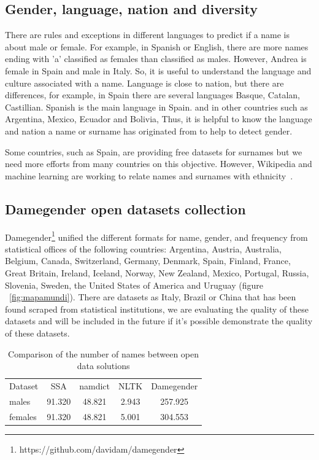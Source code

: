 \documentclass[a4paper]{article}
\begin{document}
\subsection{Gender, language, nation and diversity}
\label{sec:diversity}

There are rules and exceptions in different languages to predict if
a name is about male or female. For example, in Spanish or English,
there are more names ending with 'a' classified as females than
classified as males. However, Andrea is female in Spain and
male in Italy. So, it is useful to understand the language and culture
associated with a name. Language is close to nation, but there are
differences, for example, in Spain there are several languages Basque,
Catalan, Castillian. Spanish is the main language in Spain.
and in other countries such as Argentina, Mexico, Ecuador and Bolivia,
Thus, it is helpful to know the language and nation a name or surname
has originated from to help to detect gender.

Some countries, such as Spain, are providing free datasets for
surnames but we need more efforts from many countries on this
objective. However, Wikipedia and machine learning are working
to relate names and surnames with ethnicity~\cite{ambekar2009name}.

\subsection{Damegender open datasets collection}
\label{sec:damegender}

Damegender\footnote{https://github.com/davidam/damegender}
unified the different formats for name, gender,
and frequency from statistical offices of the following countries:
Argentina, Austria, Australia, Belgium, Canada, Switzerland, Germany,
Denmark, Spain, Finland, France, Great Britain, Ireland, Iceland,
Norway, New Zealand, Mexico, Portugal, Russia, Slovenia, Sweden,
the United States of America and Uruguay (figure ~\ref{fig:mapamundi}).
There are datasets as Italy, Brazil or China that has been found
scraped from statistical institutions, we are evaluating the quality
of these datasets and will be included in the future if it's possible
demonstrate the quality of these datasets.

\begin{table}[t]
\footnotesize
\begin{tabular}[]{lcccc}
  \hline
  Dataset & SSA & namdict & NLTK & Damegender \tabularnewline
  males & 91.320 & 48.821 & 2.943 & 257.925 \tabularnewline
  females & 91.320 & 48.821 & 5.001 & 304.553 \tabularnewline
  \hline
\end{tabular}
\caption{Comparison of the number of names between open data solutions}
\label{table:DifferentNamesMeasures}
\end{table}
\end{document}
